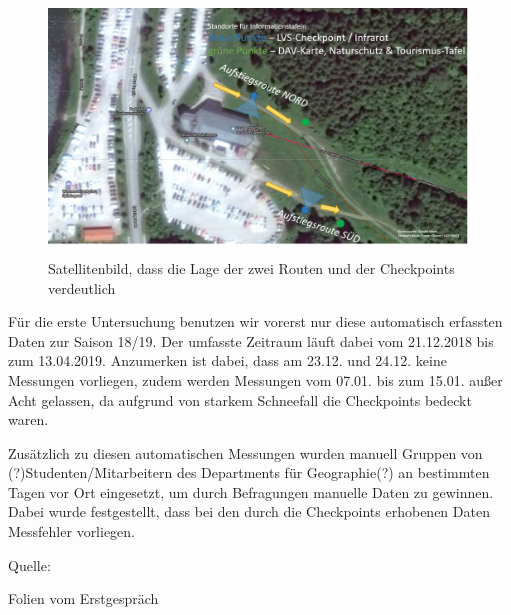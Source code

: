 \documentclass[12pt]{scrreprt}
\begin{document}
\begin{figure}[H]

\centering

\includegraphics[width=.9\textwidth]{checkpoints}

\caption{Satellitenbild, dass die Lage der zwei Routen und der Checkpoints verdeutlich}

\label{pic:checkpoints}

\end{figure}



\noindent Für die erste Untersuchung benutzen wir vorerst nur diese automatisch erfassten Daten zur Saison 18/19. Der umfasste Zeitraum läuft dabei vom 21.12.2018 bis zum 13.04.2019. Anzumerken ist dabei, dass am 23.12. und 24.12. keine Messungen vorliegen, zudem werden Messungen vom 07.01. bis zum 15.01. außer Acht gelassen, da aufgrund von starkem Schneefall die Checkpoints bedeckt waren.



Zusätzlich zu diesen automatischen Messungen wurden manuell Gruppen von (?)Studenten/Mitarbeitern des Departments für Geographie(?) an bestimmten Tagen vor Ort eingesetzt, um durch Befragungen manuelle Daten zu gewinnen. Dabei wurde festgestellt, dass bei den durch die Checkpoints erhobenen Daten Messfehler vorliegen.



Quelle:

Folien vom Erstgespräch
\end{document}
